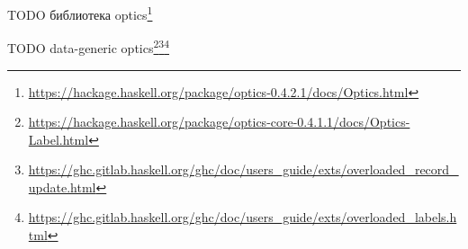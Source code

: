 TODO библиотека optics\footnote{\url{https://hackage.haskell.org/package/optics-0.4.2.1/docs/Optics.html}} %

TODO data-generic optics\footnote{\url{https://hackage.haskell.org/package/optics-core-0.4.1.1/docs/Optics-Label.html}}\footnote{\url{https://ghc.gitlab.haskell.org/ghc/doc/users_guide/exts/overloaded_record_update.html}}\footnote{\url{https://ghc.gitlab.haskell.org/ghc/doc/users_guide/exts/overloaded_labels.html}}








